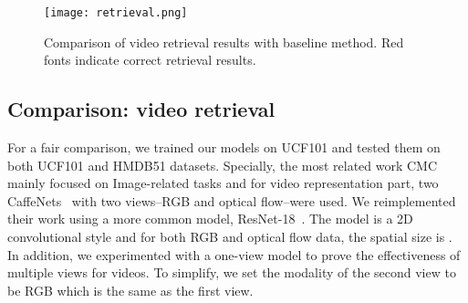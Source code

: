 \documentclass[sigconf]{acmart}
\begin{document}
\begin{figure*}[t]
  \centering
  \texttt{[image: retrieval.png]}
  \caption{Comparison of video retrieval results with baseline method. Red fonts indicate correct retrieval results.}
  \label{retrieval}
\end{figure*} 

\subsection{Comparison: video retrieval}

For a fair comparison, we trained our models on UCF101 and tested them on both UCF101 and HMDB51 datasets. Specially, the most related work CMC~\cite{tian2019contrastive} mainly focused on Image-related tasks and for video representation part, two CaffeNets~\cite{krizhevsky2012imagenet} with two views--RGB and optical flow--were used. We reimplemented their work using a more common model, ResNet-18~\cite{resnet}. The model is a 2D convolutional style and for both RGB and optical flow data, the spatial size is . In addition, we experimented with a one-view model to prove the effectiveness of multiple views for videos. To simplify, we set the modality of the second view to be RGB which is the same as the first view.

\begin{table}[t]


\end{table}
\end{document}
